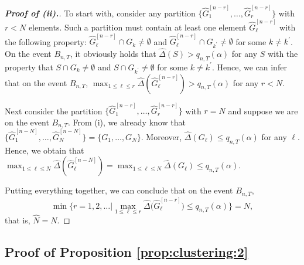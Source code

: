 \documentclass[12pt]{article}
\begin{document}
\begin{proof}[\textnormal{\textbf{Proof of (ii).}}]
To start with, consider any partition $\{ \widehat{G}_1^{[n-r]},\ldots,\widehat{G}_r^{[n-r]} \}$ with $r < N$ elements. Such a partition must contain at least one element $\widehat{G}_\ell^{[n-r]}$ with the following property: $\widehat{G}_\ell^{[n-r]} \cap G_k \ne \emptyset$ and $\widehat{G}_\ell^{[n-r]} \cap G_{k^\prime} \ne \emptyset$ for some $k \ne k^\prime$. On the event $B_{n,T}$, it obviously holds that $\widehat{\Delta}(S) > q_{n,T}(\alpha)$ for any $S$ with the property that $S \cap G_k \ne \emptyset$ and $S \cap G_{k^\prime} \ne \emptyset$ for some $k \ne k^\prime$. Hence, we can infer that on the event $B_{n,T}$, $\max_{1 \le \ell \le r} \widehat{\Delta} ( \widehat{G}_\ell^{[n-r]} ) > q_{n,T}(\alpha)$ for any $r < N$. 

Next consider the partition $\{ \widehat{G}_1^{[n-r]},\ldots,\widehat{G}_r^{[n-r]} \}$ with $r = N$ and suppose we are on the event $B_{n,T}$. From (i), we already know that $\{ \widehat{G}_1^{[n-N]},\ldots,\widehat{G}_N^{[n-N]} \} =\{ G_1,\ldots,G_N \}$. Moreover, $\widehat{\Delta}(G_\ell) \le q_{n,T}(\alpha)$ for any $\ell$. Hence, we obtain that $\max_{1 \le \ell \le N} \widehat{\Delta} ( \widehat{G}_\ell^{[n-N]} ) = \max_{1 \le \ell \le N} \widehat{\Delta} (G_\ell) \le q_{n,T}(\alpha)$.

Putting everything together, we can conclude that on the event $B_{n,T}$, 
\[ \min \Big\{ r = 1,2,\ldots \Big| \max_{1 \le \ell \le r} \widehat{\Delta} \big( \widehat{G}_\ell^{[n-r]} \big) \le q_{n,T}(\alpha) \Big\} = N, \]
that is, $\widehat{N} = N$. 
\end{proof}



\subsection*{Proof of Proposition \ref{prop:clustering:2}}
\end{document}

